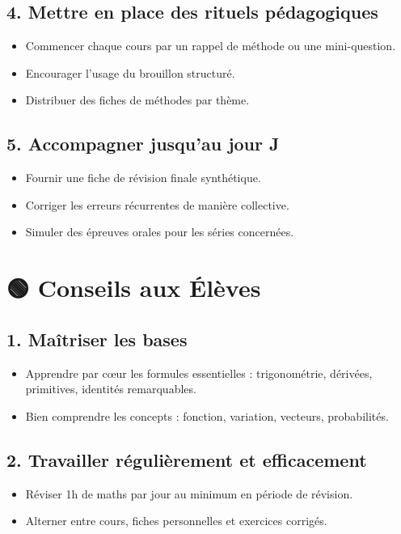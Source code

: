 \subsection*{4. Mettre en place des rituels pédagogiques}
\begin{itemize}[label=--]
    \item Commencer chaque cours par un rappel de méthode ou une mini-question.
    \item Encourager l’usage du brouillon structuré.
    \item Distribuer des fiches de méthodes par thème.
\end{itemize}

\subsection*{5. Accompagner jusqu’au jour J}
\begin{itemize}[label=--]
    \item Fournir une fiche de révision finale synthétique.
    \item Corriger les erreurs récurrentes de manière collective.
    \item Simuler des épreuves orales pour les séries concernées.
\end{itemize}

\section*{🟢 Conseils aux Élèves}

\subsection*{1. Maîtriser les bases}
\begin{itemize}[label=--]
    \item Apprendre par cœur les formules essentielles : trigonométrie, dérivées, primitives, identités remarquables.
    \item Bien comprendre les concepts : fonction, variation, vecteurs, probabilités.
\end{itemize}

\subsection*{2. Travailler régulièrement et efficacement}
\begin{itemize}[label=--]
    \item Réviser 1h de maths par jour au minimum en période de révision.
    \item Alterner entre cours, fiches personnelles et exercices corrigés.
\end{itemize}

